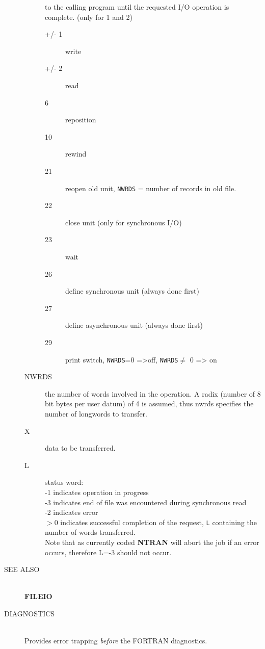 \begin{description}
\begin{description}
to the calling program until the requested I/O
operation is complete. (only for 1 and 2)
\begin{description}
\item[+/- 1] write
\item[+/- 2] read
\item[6] reposition
\item[10] rewind
\item[21] reopen old unit, {\tt NWRDS} = number of records in old file.
\item[22] close unit (only for synchronous I/O)
\item[23] wait
\item[26] define synchronous  unit (always done first)
\item[27] define asynchronous unit (always done first)
\item[29] print switch, {\tt NWRDS}=0 =>off, {\tt NWRDS}$\not=$ 0 => on
\end{description}
\item[NWRDS] the number of words involved in the operation.
A radix (number of 8 bit bytes per user datum)
of 4 is assumed, thus nwrds specifies the number of
longwords to transfer.
\item[X] data to be transferred.
\item[L] status word: \\
-1 indicates operation in progress \\
-3 indicates end of file was encountered during 
synchronous read \\
-2 indicates error \\
$>0$ indicates successful completion of the request,
{\tt L} containing the number of words transferred. \\
Note that as currently coded {\bf NTRAN} will abort the job
if an error occurs, therefore L=-3 should not occur.
\end{description}
\item[SEE ALSO] \ \\
{\bf FILEIO}
\item[DIAGNOSTICS] \ \\
Provides error trapping {\em before} the FORTRAN diagnostics.
\end{description}

